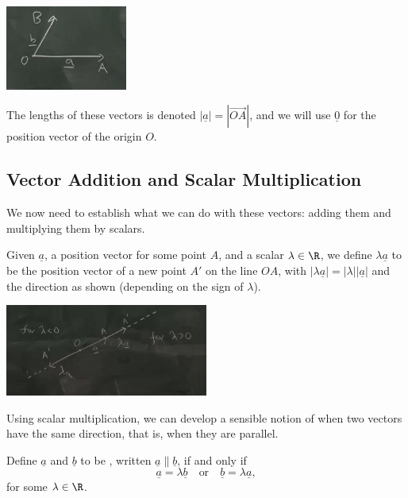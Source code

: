 \documentclass[a4]{scrartcl}
\begin{document}
\begin{center}
	\includegraphics[width=0.3\textwidth]{vector_intro.png}
\end{center}

The lengths of these vectors is denoted $|\underline{a}| = |\overrightarrow{OA}|$, and we will use $\underline{0}$ for the position vector of the origin $O$.

\subsection{Vector Addition and Scalar Multiplication}

We now need to establish what we can do with these vectors: adding them and multiplying them by scalars.

\begin{definition}
	Given $\underline{a}$, a position vector for some point $A$, and a scalar $\lambda \in \R$, we define $\lambda \underline{a}$ to be the position vector of a new point $A'$ on the line $OA$, with $|\lambda \underline{a}| = |\lambda||\underline{a}|$ and the direction as shown (depending on the sign of $\lambda$).
	\begin{center}
		\includegraphics[width=0.5\textwidth]{scalar_multiplication.png}
	\end{center}
\end{definition}

Using scalar multiplication, we can develop a sensible notion of when two vectors have the same direction, that is, when they are parallel.

\begin{definition}[Parallelism]
	Define $\underline{a}$ and $\underline{b}$ to be , written $\underline{a} \parallel \underline{b}$, if and only if
	$$
	\underline{a} = \lambda \underline{b} \quad \text{or} \quad \underline{b} = \lambda \underline{a},
	$$
	for some $\lambda \in \R$.
\end{definition}
\end{document}
